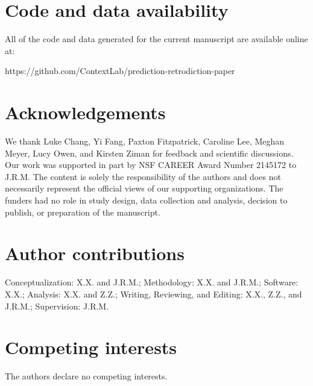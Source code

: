 \documentclass[10pt]{article}
\begin{document}
\section*{Code and data availability}
All of the code and data generated for the current manuscript are available online at:

https://github.com/ContextLab/prediction-retrodiction-paper

% 


\section*{Acknowledgements}
We thank Luke Chang, Yi Fang, Paxton Fitzpatrick, Caroline Lee, Meghan Meyer, Lucy Owen, and Kirsten Ziman for feedback and scientific discussions.  Our work was supported in part by NSF CAREER Award Number 2145172 to J.R.M. The content is solely the responsibility of the authors and does not necessarily represent the official views of our supporting organizations.  The funders had no role in study design, data collection and analysis, decision to publish, or preparation of the manuscript.

\section*{Author contributions}
Conceptualization: X.X. and J.R.M.; Methodology: X.X. and J.R.M.; Software: X.X.; Analysis: X.X. and Z.Z.; Writing, Reviewing, and Editing: X.X., Z.Z., and J.R.M.; Supervision: J.R.M.

\section*{Competing interests}
The authors declare no competing interests.
\end{document}
